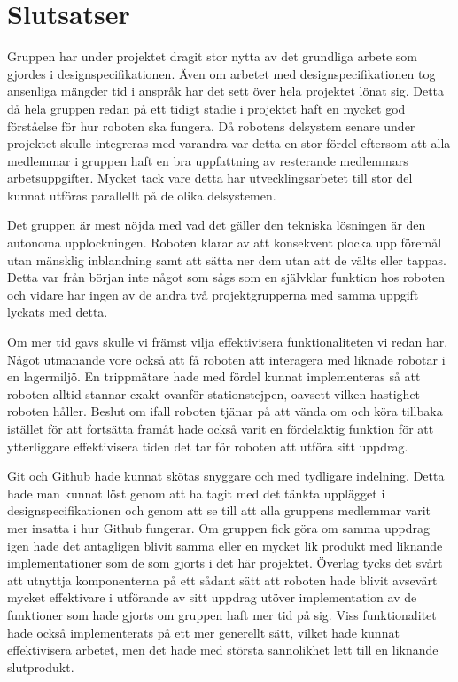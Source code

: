 
\section{Slutsatser}

Gruppen har under projektet dragit stor nytta av det grundliga arbete som gjordes i designspecifikationen. Även om arbetet med designspecifikationen tog ansenliga mängder tid i anspråk har det sett över hela projektet lönat sig. Detta då hela gruppen redan på ett tidigt stadie i projektet haft en mycket god förståelse för hur roboten ska fungera. Då robotens delsystem senare under projektet skulle integreras med varandra var detta en stor fördel eftersom att alla medlemmar i gruppen haft en bra uppfattning av resterande medlemmars arbetsuppgifter. Mycket tack vare detta har utvecklingsarbetet till stor del kunnat utföras parallellt på de olika delsystemen. 

Det gruppen är mest nöjda med vad det gäller den tekniska lösningen är den autonoma upplockningen. Roboten klarar av att konsekvent plocka upp föremål utan mänsklig inblandning samt att sätta ner dem utan att de välts eller tappas. Detta var från början inte något som sågs som en självklar funktion hos roboten och vidare har ingen av de andra två projektgrupperna med samma uppgift lyckats med detta.

Om mer tid gavs skulle vi främst vilja effektivisera funktionaliteten vi redan har. Något utmanande vore också att få roboten att interagera med liknade robotar i en lagermiljö. En trippmätare hade med fördel kunnat implementeras så att roboten alltid stannar exakt ovanför stationstejpen, oavsett vilken hastighet roboten håller. Beslut om ifall roboten tjänar på att vända om och köra tillbaka istället för att fortsätta framåt hade också varit en fördelaktig funktion för att ytterliggare effektivisera tiden det tar för roboten att utföra sitt uppdrag.

Git och Github hade kunnat skötas snyggare och med tydligare indelning. Detta hade man kunnat löst genom att ha tagit med det tänkta upplägget i designspecifikationen och genom att se till att alla gruppens medlemmar varit mer insatta i hur Github fungerar.
Om gruppen fick göra om samma uppdrag igen hade det antagligen blivit samma eller en mycket lik produkt med liknande implementationer som de som gjorts i det här projektet. Överlag tycks det svårt att utnyttja komponenterna på ett sådant sätt att roboten hade blivit avsevärt mycket effektivare i utförande av sitt uppdrag utöver implementation av de funktioner som hade gjorts om gruppen haft mer tid på sig. Viss funktionalitet hade också implementerats på ett mer generellt sätt, vilket hade kunnat effektivisera arbetet, men det hade med största sannolikhet lett till en liknande slutprodukt.
